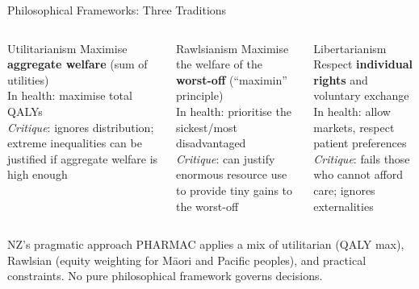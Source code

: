 \documentclass[aspectratio=169, 12pt]{beamer}
\begin{document}
\begin{frame}{Philosophical Frameworks: Three Traditions}
  \begin{columns}
      \begin{block}{Utilitarianism}
        Maximise \textbf{aggregate welfare} (sum of utilities)\\[0.3em]
        In health: maximise total QALYs\\[0.3em]
        \textit{Critique}: ignores distribution; extreme inequalities can be justified if
        aggregate welfare is high enough
      \end{block}
      \begin{alertblock}{Rawlsianism}
        Maximise the welfare of the \textbf{worst-off} (``maximin'' principle)\\[0.3em]
        In health: prioritise the sickest/most disadvantaged\\[0.3em]
        \textit{Critique}: can justify enormous resource use to provide tiny gains to the worst-off
      \end{alertblock}
      \begin{block}{Libertarianism}
        Respect \textbf{individual rights} and voluntary exchange\\[0.3em]
        In health: allow markets, respect patient preferences\\[0.3em]
        \textit{Critique}: fails those who cannot afford care; ignores externalities
      \end{block}
  \end{columns}
  \vspace{0.4em}
  \begin{exampleblock}{NZ's pragmatic approach}
    PHARMAC applies a mix of utilitarian (QALY max), Rawlsian (equity weighting for Māori and
    Pacific peoples), and practical constraints. No pure philosophical framework governs decisions.
  \end{exampleblock}
\end{frame}
\end{document}
